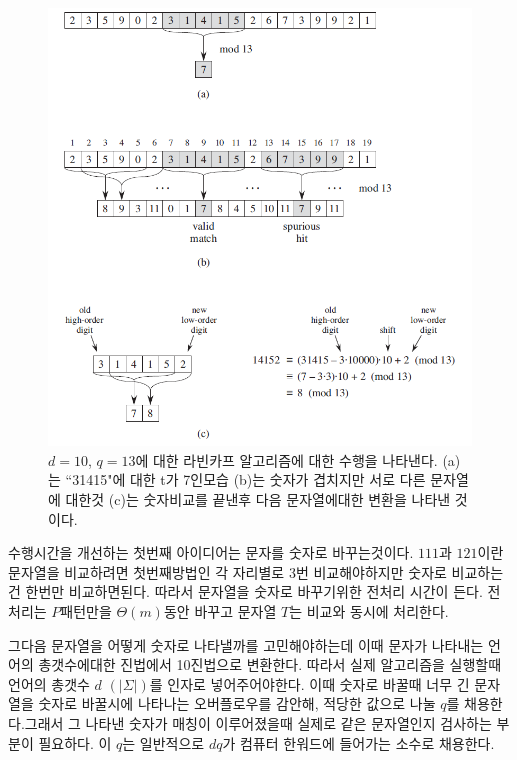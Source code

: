 \begin{figure}[h!]
    \centering
    \includegraphics[scale=0.6]{./string_matching/pic1.PNG}
    \caption{$d = 10$, $q = 13$에 대한 라빈카프 알고리즘에 대한 수행을 나타낸다. (a)는 ``31415"에 대한 t가 7인모습 (b)는 숫자가 겹치지만 서로 다른 문자열에 대한것 (c)는 숫자비교를 끝낸후 다음 문자열에대한 변환을 나타낸 것이다.}
\end{figure}


수행시간을 개선하는 첫번째 아이디어는 문자를 숫자로 바꾸는것이다.
$111$과 $121$이란 문자열을 비교하려면 첫번째방법인 각 자리별로 3번 비교해야하지만 숫자로 비교하는건 한번만 비교하면된다.
따라서 문자열을 숫자로 바꾸기위한 전처리 시간이 든다.
전처리는 $P$패턴만을 $\Theta(m)$동안 바꾸고 문자열 $T$는 비교와 동시에 처리한다.

그다음 문자열을 어떻게 숫자로 나타낼까를 고민해야하는데 이때 문자가 나타내는 언어의 총갯수에대한 진법에서 10진법으로 변환한다. 따라서 실제 알고리즘을 실행할때 언어의 총갯수 $d$ $(|\Sigma|)$를 인자로 넣어주어야한다.
이때 숫자로 바꿀때 너무 긴 문자열을 숫자로 바꿀시에 나타나는 오버플로우를 감안해, 적당한 값으로 나눌 $q$를 채용한다.그래서 그 나타낸 숫자가 매칭이 이루어졌을때 실제로 같은 문자열인지 검사하는 부분이 필요하다. 이 $q$는 일반적으로 $dq$가 컴퓨터 한워드에 들어가는 소수로 채용한다.

